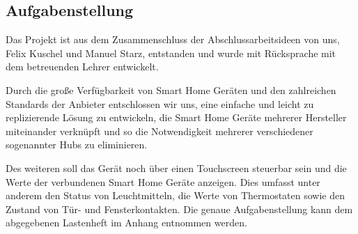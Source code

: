 \subsection{Aufgabenstellung}\label{vw_aufgabenstellung}
Das Projekt ist aus dem Zusammenschluss der Abschlussarbeitsideen von uns, Felix Kuschel und Manuel Starz, entstanden und wurde mit Rücksprache mit dem betreuenden Lehrer entwickelt.\par
\noindent Durch die große Verfügbarkeit von Smart Home Geräten und den zahlreichen Standards der Anbieter entschlossen wir uns, eine einfache und leicht zu replizierende Lösung zu entwickeln, die Smart Home Geräte mehrerer Hersteller miteinander verknüpft und so die Notwendigkeit mehrerer verschiedener sogenannter Hubs zu eliminieren.\par
\noindent Des weiteren soll das Gerät noch über einen Touchscreen steuerbar sein und die Werte der verbundenen Smart Home Geräte anzeigen.
Dies umfasst unter anderem den Status von Leuchtmitteln, die Werte von Thermostaten sowie den Zustand von Tür- und Fensterkontakten. 
Die genaue Aufgabenstellung kann dem abgegebenen Lastenheft im Anhang entnommen werden.